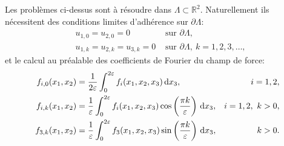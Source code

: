 Les problèmes ci-dessus sont à résoudre dans $\Lambda \subset
\mathbb R^2$. Naturellement ils nécessitent des
conditions limites d'adhérence sur $\partial \Lambda$:
\begin{align}
  & u_{1,0} = u_{2,0} = 0 & \text{ sur } \partial \Lambda,\\
  & u_{1,k} = u_{2,k} = u_{3,k} = 0 &\text{ sur } \partial \Lambda,\ k
  = 1, 2, 3,\dots,
\end{align}
et le calcul au préalable des coefficients de Fourier du champ de force:
\begin{align}
  f_{i,0}(x_1, x_2) %
  &= \frac{1}{2\thickness}\int_0^{2\thickness}f_i(x_1, x_2, x_3)%
  \,\mathrm dx_3,& i = 1,2,\label{eq:force-coefficient-1}\\
  f_{i,k}(x_1, x_2) %
  &= \frac{1}{\thickness}\int_0^{2\thickness}f_i(x_1, x_2, x_3)%
  \cos\parent{\frac{\pi k}{\thickness}}\,\mathrm dx_3,& i = 1,2,\ k > 0,\label{eq:force-coefficient-2}\\
  f_{3,k}(x_1, x_2)%
  &= \frac{1}{\thickness}\int_0^{2\thickness}f_3(x_1, x_2, x_3)%
  \sin\parent{\frac{\pi k}{\thickness}}\,\mathrm dx_3,& k > 0.\label{eq:force-coefficient-3}
\end{align}

